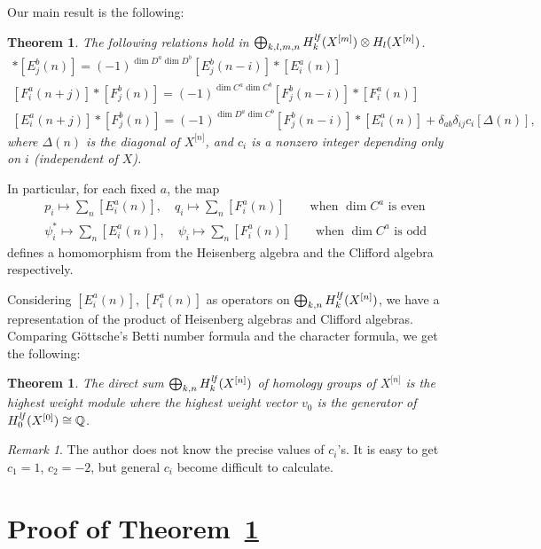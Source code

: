 \documentclass[12pt]{amsart}
\newcommand{\rom}{\text}
\newtheorem{Theorem}[equation]{Theorem}
\theoremstyle{definition}
\theoremstyle{remark}
\newtheorem{Remark}[equation]{Remark}
\numberwithin{equation}{section}
\newcommand{\thmref}[1]{Theorem~\ref{#1}}
\newcommand{\Hilb}[2]{{#1}^{\lbrack{#2}\rbrack}} %
\newcommand{\Hilbn}[1]{\Hilb{#1}{n}}
\newcommand{\HilbX}[1]{\Hilb{X}{#1}}
\newcommand{\Hlf}{H^{\it lf}} %
\begin{document}
Our main result is the following:
\begin{Theorem}
  The following relations hold in
  $\bigoplus_{k,l,m,n} \Hlf_k(\HilbX{m})\otimes H_l(\HilbX{n})$.
  \begin{gather}
    [E_i^a(n-j)]\ast [E_j^b(n)] =
    (-1)^{\dim D^a\dim D^b}[E_j^b(n-i)] \ast [E_i^a(n)]\label{eq:EE}\\
    [F_i^a(n+j)]\ast [F_j^b(n)] =
    (-1)^{\dim C^a\dim C^b}[F_j^b(n-i)] \ast [F_i^a(n)]\label{eq:FF}\\
    [E_i^a(n+j)]\ast [F_j^b(n)] =
    (-1)^{\dim D^a\dim C^b}[F_j^b(n-i)] \ast [E_i^a(n)]
    + \delta_{ab}\delta_{ij}c_i [\Delta(n)]\label{eq:EF},
  \end{gather}
  where $\Delta(n)$ is the diagonal of $\Hilbn{X}$, and $c_i$ is a
  nonzero integer depending only on $i$ \rom(independent of $X$\rom).
\label{th:main}\end{Theorem}
In particular, for each fixed $a$, the map
\begin{align*}
  & p_i \mapsto \sum_n [E_i^a(n)], \quad q_i \mapsto \sum_n [F_i^a(n)]
  \qquad\text{when $\dim C^a$ is even} \\
  & \psi_i^*\mapsto \sum_n [E_i^a(n)], \quad
  \psi_i\mapsto \sum_n [F_i^a(n)]
  \qquad\text{when $\dim C^a$ is odd}
\end{align*}
defines a homomorphism from the Heisenberg algebra and the Clifford
algebra respectively.

Considering $[E_i^a(n)]$, $[F_i^a(n)]$ as operators on
$\bigoplus_{k,n} \Hlf_k(\HilbX{n})$, we have a representation of the
product of Heisenberg algebras and Clifford algebras. Comparing
G\"ottsche's Betti number formula and the character formula, we get
the following:
\begin{Theorem}
  The direct sum $\bigoplus_{k,n} \Hlf_k(\HilbX{n})$ of homology groups
  of $\HilbX{n}$ is the highest weight module where the highest weight
  vector $v_0$ is the generator of $\Hlf_0(\HilbX{0})\cong\mathbb Q$.
\end{Theorem}

\begin{Remark}
  The author does not know the precise values of $c_i$'s. It is easy
  to get $c_1 = 1$, $c_2 = -2$, but general $c_i$ become difficult to
  calculate.
\end{Remark}
%
\section{Proof of {\protect\thmref{th:main}}}
\label{sec:proof}
%
\end{document}
